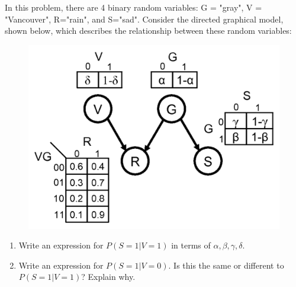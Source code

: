 
In this problem, there are 4 binary random variables: G = "gray", V = "Vancouver", R="rain", and S="sad". Consider the directed graphical model, shown below, which describes the relationship between these random variables:

\begin{figure}[H]

\begin{minipage}[b]{1.0\linewidth}
  \centerline{\includegraphics[scale=0.27]{weatherbn.pdf}}
\end{minipage}
\end{figure}


\begin{enumerate}[label=(\alph*)]
\item Write an expression for $P(S=1|V=1)$ in terms of $\alpha, \beta, \gamma, \delta$.
\item Write an expression for $P(S=1|V=0)$. Is this the same or different to $P(S=1|V=1)$? Explain why.
\end{enumerate}
